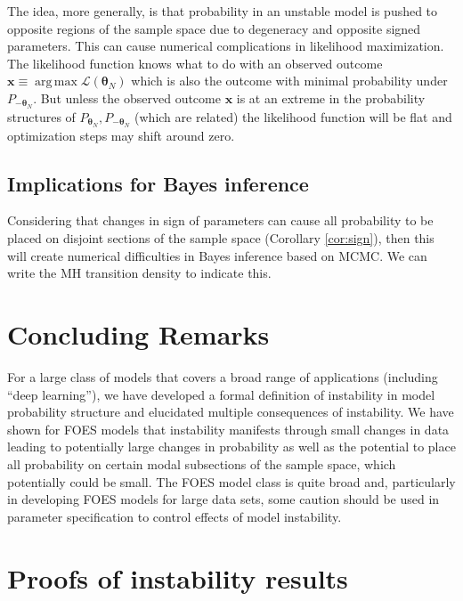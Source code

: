 \documentclass[12pt]{article}
\theoremstyle{definition}
\DeclareMathOperator*{\argmax}{arg\,max}
\begin{document}
The idea, more generally, is that probability in an unstable model is
pushed to opposite regions of the sample space due to degeneracy and
opposite signed parameters. This can cause numerical complications in
likelihood maximization. The likelihood function knows what to do with
an observed outcome
\(\boldsymbol x \equiv \argmax \mathcal{L}(\boldsymbol \theta_N)\) which
is also the outcome with minimal probability under
\(P_{-\boldsymbol \theta_N}\). But unless the observed outcome
\(\boldsymbol x\) is at an extreme in the probability structures of
\(P_{\boldsymbol \theta_N}, P_{-\boldsymbol \theta_N}\) (which are
related) the likelihood function will be flat and optimization steps may
shift around zero.

\subsection{Implications for Bayes
inference}\label{implications-for-bayes-inference}

Considering that changes in sign of parameters can cause all probability
to be placed on disjoint sections of the sample space (Corollary
\ref{cor:sign}), then this will create numerical difficulties in Bayes
inference based on MCMC. We can write the MH transition density to
indicate this.

\section{Concluding Remarks}\label{conclusions}

For a large class of models that covers a broad range of applications
(including ``deep learning''), we have developed a formal definition of
instability in model probability structure and elucidated multiple
consequences of instability. We have shown for FOES models that
instability manifests through small changes in data leading to
potentially large changes in probability as well as the potential to
place all probability on certain modal subsections of the sample space,
which potentially could be small. The FOES model class is quite broad
and, particularly in developing FOES models for large data sets, some
caution should be used in parameter specification to control effects of
model instability.

\clearpage

\appendix


\section{Proofs of instability results}\label{appendix-instab}
\end{document}
